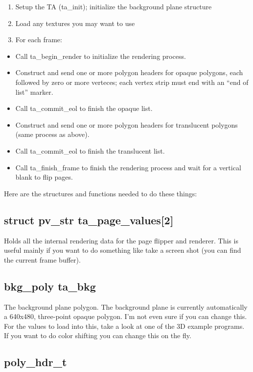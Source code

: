 \documentclass[english]{report}
\begin{document}
\begin{enumerate}
\item Setup the TA (ta\_init); initialize the background plane structure
\item Load any textures you may want to use
\item For each frame:
\end{enumerate}
\begin{itemize}
\item Call ta\_begin\_render to initialize the rendering process.
\item Construct and send one or more polygon headers for opaque polygons,
each followed by zero or more verteces; each vertex strip must end
with an ``end of list'' marker.
\item Call ta\_commit\_eol to finish the opaque list.
\item Construct and send one or more polygon headers for translucent polygons
(same process as above).
\item Call ta\_commit\_eol to finish the translucent list.
\item Call ta\_finish\_frame to finish the rendering process and wait for
a vertical blank to flip pages.
\end{itemize}
Here are the structures and functions needed to do these things:


\subsection{struct pv\_str ta\_page\_values{[}2{]}}

Holds all the internal rendering data for the page flipper and renderer.
This is useful mainly if you want to do something like take a screen
shot (you can find the current frame buffer).


\subsection{bkg\_poly ta\_bkg}

The background plane polygon. The background plane is currently automatically
a 640x480, three-point opaque polygon. I'm not even sure if you can
change this. For the values to load into this, take a look at one
of the 3D example programs. If you want to do color shifting you can
change this on the fly.


\subsection{poly\_hdr\_t}
\end{document}
